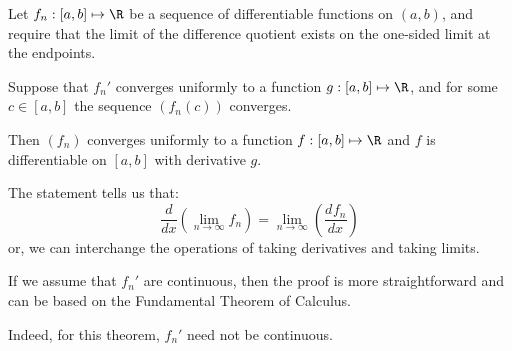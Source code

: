 \documentclass[../Main.tex]{subfiles}
\begin{document}
\begin{theorem}
    Let $f_n : [a, b] \mapsto \R$ be a sequence of differentiable functions on $(a, b)$, and require that the limit of the difference quotient exists on the one-sided limit at the endpoints.

    Suppose that $f_n'$ converges uniformly to a function $g : [a, b] \mapsto \R$, and for some $c \in [a, b]$ the sequence $(f_n(c))$ converges.

    Then $(f_n)$ converges uniformly to a function $f : [a, b] \mapsto \R$ and $f$ is differentiable on $[a, b]$ with derivative $g$.
    \label{thmUCDiff}
\end{theorem}
\begin{remarks}
    \item The statement tells us that:
        \begin{equation*}
            \frac{d}{dx}\left(\lim_{n \to \infty} f_n\right) = \lim_{n \to \infty} \left(\frac{d^{}f_n}{dx^{}}\right)
        \end{equation*}
        or, we can interchange the operations of taking derivatives and taking limits.
    \item If we assume that $f_n'$ are continuous, then the proof is more straightforward and can be based on the Fundamental Theorem of Calculus.
    \item Indeed, for this theorem, $f_n'$ need not be continuous.
\end{remarks}
\end{document}
